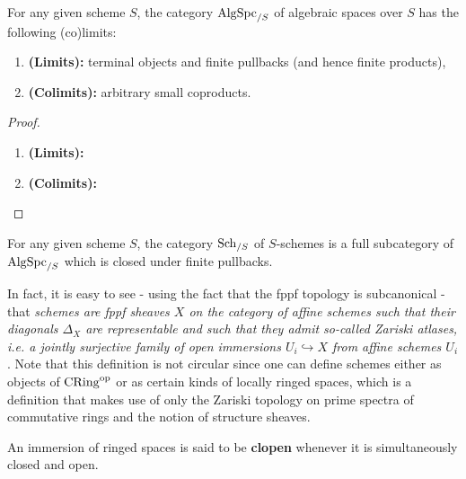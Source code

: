             \begin{proposition} \label{prop: (co)limits_of_algebraic_spaces}
                For any given scheme $S$, the category $\mathrm{Alg}\mathrm{Spc}_{/S}$ of algebraic spaces over $S$ has the following (co)limits:
                    \begin{enumerate}
                        \item \textbf{(Limits):} terminal objects and finite pullbacks (and hence finite products),
                        \item \textbf{(Colimits):} arbitrary small coproducts.
                    \end{enumerate}
            \end{proposition}
                \begin{proof}
                    \noindent
                    \begin{enumerate}
                        \item \textbf{(Limits):} 
                        \item \textbf{(Colimits):} 
                    \end{enumerate}
                \end{proof}
            \begin{corollary} \label{coro: schemes_are_algebraic_spaces}
                For any given scheme $S$, the category $\mathrm{Sch}_{/S}$ of $S$-schemes is a full subcategory of $\mathrm{Alg}\mathrm{Spc}_{/S}$ which is closed under finite pullbacks.
            \end{corollary}
            \begin{remark} \label{remark: sheaf_theoretic_definition_of_schemes}
                In fact, it is easy to see - using the fact that the fppf topology is subcanonical - that \textit{schemes are fppf sheaves $X$ on the category of affine schemes such that their diagonals $\Delta_X$ are representable and such that they admit so-called Zariski atlases, i.e. a jointly surjective family of open immersions $U_i \hookrightarrow X$ from affine schemes $U_i$}. Note that this definition is not circular since one can define schemes either as objects of $\mathrm{CRing}^{\mathrm{op}}$ or as certain kinds of locally ringed spaces, which is a definition that makes use of only the Zariski topology on prime spectra of commutative rings and the notion of structure sheaves.
            \end{remark}
            \begin{definition} \label{def: clopen_immersions_of_ringed_spaces}
                An immersion of ringed spaces is said to be \textbf{clopen} whenever it is simultaneously closed and open.
            \end{definition}
